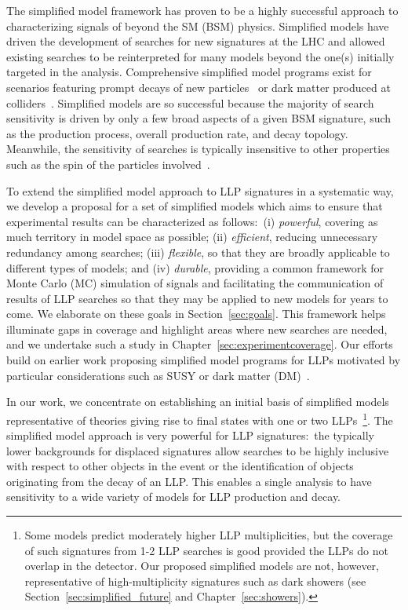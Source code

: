 The simplified model framework has proven to be a highly successful approach to characterizing signals of beyond the SM (BSM) physics.
Simplified models have driven the development of searches for new signatures at the LHC and allowed existing searches to be reinterpreted for many models beyond the one(s) initially targeted in the analysis.
Comprehensive simplified model programs exist for scenarios featuring prompt decays of new particles~\cite{ArkaniHamed:2005px,Knuteson:2006ha,ArkaniHamed:2007fw,Aaltonen:2007dg,Alwall:2008ag,Alwall:2008va,Alves:2011wf} or dark matter produced at colliders~\cite{Petriello:2008pu,Dudas:2009uq,Goodman:2011jq,An:2012va,Frandsen:2012rk,Dreiner:2013vla,Cotta:2013jna,Abdallah:2015ter,Abercrombie:2015wmb,Boveia:2016mrp,Arina:2016cqj,Abe:2018bpo}.
Simplified models are so successful because the majority of search sensitivity is driven by only a few broad aspects of a given BSM signature, such as the production process, overall production rate, and decay topology.
Meanwhile, the sensitivity of searches is typically insensitive to other properties such as the spin of the particles involved~\cite{Edelhauser:2015ksa,Edelhauser:2014ena,Arina:2015uea,Kraml:2016eti}.

To extend the simplified model approach to LLP signatures in a systematic way, we develop a proposal for a set of simplified models which aims to ensure that experimental results can be characterized as follows:~(i) {\em powerful}, covering as much territory in model space as possible; (ii) {\em efficient}, reducing unnecessary redundancy among searches; (iii) {\em flexible}, so that they are broadly applicable to different types of models; and (iv) {\em durable}, providing a common framework for Monte Carlo (MC) simulation of signals and facilitating the communication of results of LLP searches so that they may be applied to new models for years to come.
We elaborate on these goals in Section~\ref{sec:goals}.
This framework helps illuminate gaps in coverage and highlight areas where new searches are needed, and we undertake such a study in Chapter~\ref{sec:experimentcoverage}. Our efforts build on earlier work proposing simplified model programs for LLPs motivated by particular considerations such as SUSY or dark matter (DM)~\cite{Heisig:2012zq,Liu:2015bma,Heisig:2015yla,Khoze:2017ixx,Mahbubani:2017gjh,Buchmueller:2017uqu}.

In our work, we concentrate on establishing an initial basis of simplified models representative of theories giving rise to final states with one or two LLPs~\footnote{Some models predict moderately higher LLP multiplicities, but the coverage of such signatures from 1-2 LLP searches is good provided the LLPs do not overlap in the detector. Our proposed simplified models are not, however, representative of high-multiplicity signatures such as dark showers (see Section~\ref{sec:simplified_future} and Chapter~\ref{sec:showers}).}.
The simplified model approach is very powerful for LLP signatures:~the typically lower backgrounds for displaced signatures allow searches to be highly inclusive with respect to other objects in the event or the identification of objects originating from the decay of an LLP.
This enables a single analysis to have sensitivity to a wide variety of models for LLP production and decay.


